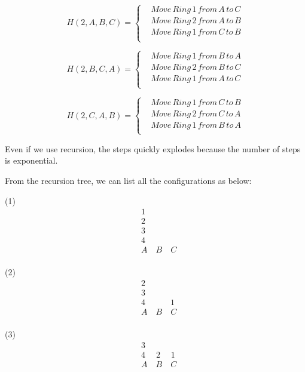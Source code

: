 \documentclass[a4paper,11pt]{article}
\theoremstyle{mytheor}
\begin{document}
$$H(2,A,B,C)=\left\{
\begin{aligned}
&Move\, Ring\, 1\, from\, A\, to\, C\\
&Move\, Ring\, 2\, from\, A\, to\, B\\
&Move\, Ring\, 1\, from\, C\, to\, B\\
\end{aligned}
\right.
$$

$$H(2,B,C,A)=\left\{
\begin{aligned}
&Move\, Ring\, 1\, from\, B\, to\, A\\
&Move\, Ring\, 2\, from\, B\, to\, C\\
&Move\, Ring\, 1\, from\, A\, to\, C\\
\end{aligned}
\right.
$$

$$H(2,C,A,B)=\left\{
\begin{aligned}
&Move\, Ring\, 1\, from\, C\, to\, B\\
&Move\, Ring\, 2\, from\, C\, to\, A\\
&Move\, Ring\, 1\, from\, B\, to\, A\\
\end{aligned}
\right.
$$

Even if we use recursion, the steps quickly explodes because the number of steps is exponential.

From the recursion tree, we can list all the configurations as below:

(1)
$$
\begin{aligned}
&1\\
&2\\
&3\\
&4\\
&A\quad B\quad C\\
\end{aligned}
$$

(2)
$$
\begin{aligned}
&2\\
&3\\
&4\qquad\quad1\\
&A\quad B\quad C\\
\end{aligned}
$$

(3)
$$
\begin{aligned}
&3\\
&4\quad\; 2\quad\;1\\
&A\quad B\quad C\\
\end{aligned}
$$
\end{document}
